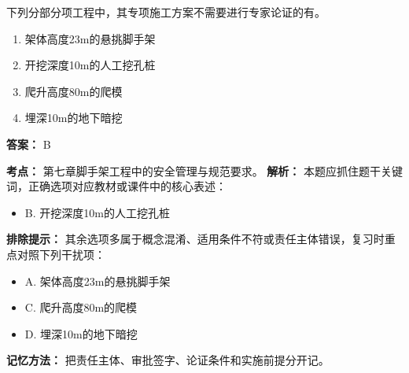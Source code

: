\documentclass[UTF8,fontset=fandol,11pt]{ctexart}
\begin{document}
\begin{quizbox}[title={第 3 题}]
下列分部分项工程中，其专项施工方案不需要进行专家论证的有。\\
\begin{enumerate}[label=\Alph*.]
\item 架体高度23m的悬挑脚手架
\item 开挖深度10m的人工挖孔桩
\item 爬升高度80m的爬模
\item 埋深10m的地下暗挖
\end{enumerate}
\textbf{答案：} B
\vspace{0.25em}
\begin{answerbox}[title={考点解析}]
\textbf{考点：} 第七章脚手架工程中的安全管理与规范要求。
\textbf{解析：} 本题应抓住题干关键词，正确选项对应教材或课件中的核心表述：
\begin{itemize}
\item B. 开挖深度10m的人工挖孔桩
\end{itemize}
\textbf{排除提示：} 其余选项多属于概念混淆、适用条件不符或责任主体错误，复习时重点对照下列干扰项：
\begin{itemize}
\item A. 架体高度23m的悬挑脚手架
\item C. 爬升高度80m的爬模
\item D. 埋深10m的地下暗挖
\end{itemize}
\textbf{记忆方法：} 把责任主体、审批签字、论证条件和实施前提分开记。
\end{answerbox}
\end{quizbox}
\end{document}

